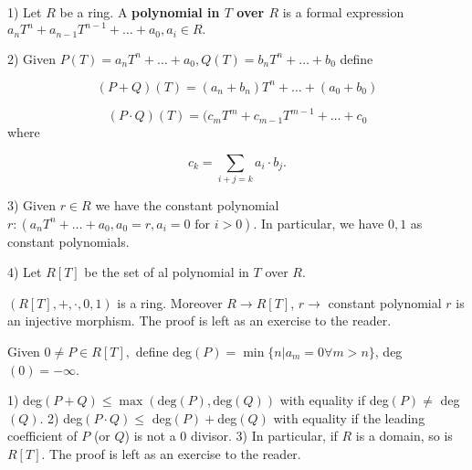 \begin{defn} \label{Defn 3, Jan 11}

1) Let $R$ be a ring. A \textbf{polynomial in $T$ over $R$} is a formal expression $a_nT^n+a_{n-1}T^{n-1}+\ldots+a_0,a_i\in R.$

2) Given $P(T)=a_nT^n+\ldots+a_0,Q(T)=b_nT^n+\ldots+b_0$ define

$$(P+Q)(T)=(a_n+b_n)T^n+\ldots+(a_0+b_0)$$

$$(P\cdot Q)(T)=(c_mT^m+c_{m-1}T^{m-1}+\ldots+c_0$$ where

$$c_k=\sum_{i+j=k}a_i\cdot b_j.$$

3) Given $r\in R$ we have the constant polynomial
$r:(a_nT^n+\ldots+a_0,a_0=r,a_i=0\text{ for } i>0).$ In particular, we have $0,1$ as constant polynomials.

4) Let $R[T]$ be the set of al polynomial in $T$ over $R$.

\begin{fact} \label{Fact 4, Jan 11}
    $(R[T],+,\cdot,0,1)$ is a ring. Moreover $R\rightarrow R[T]$, $r\rightarrow$ constant polynomial $r$ is an injective morphism. The proof is left as an exercise to the reader.
\end{fact}

\end{defn}

\begin{defn} \label{Defn 5, Jan 11}

Given $0\ne P\in R[T],$ define deg$(P)=\min\{n|a_m=0\forall m>n\}$, deg$(0)=-\infty$.
\end{defn}
\begin{fact}\label{Fact 6, Jan 11}
1) deg$(P+Q)\leq\max(\text{deg}(P),\text{deg}(Q))$ with equality if deg$(P)\ne$ deg$(Q)$.
2) deg$(P\cdot Q)\leq$ deg$(P)+$deg$(Q)$ with equality if the leading coefficient of $P$ (or $Q$) is not a 0 divisor.
3) In particular, if $R$ is a domain, so is $R[T].$ The proof is left as an exercise to the reader.
\end{fact}

